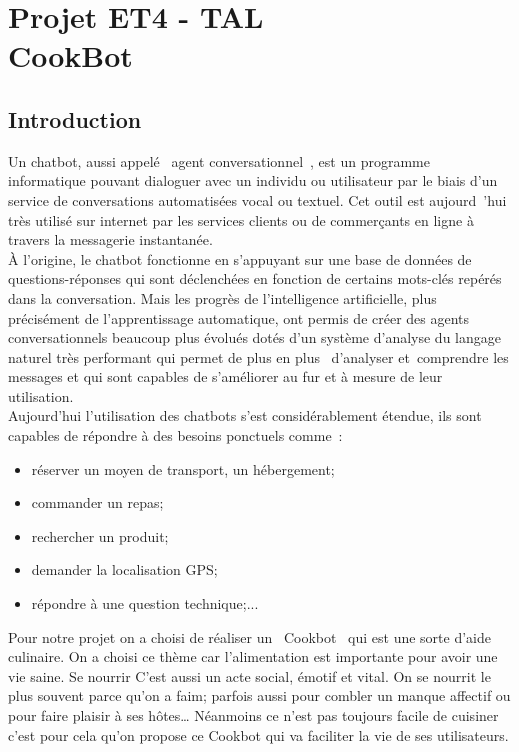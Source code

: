 \documentclass{report}
\title{}\let\mytitle\thetitle
\author{Karim \textsc{Balde}\\Yasmine \textsc{Kertous}\\Thibault \textsc{Lasou}}
\date\today
\begin{document}
\pagestyle{polytech}
\chapter*{Projet ET4 - TAL\\CookBot}
\section*{Introduction}

Un chatbot, aussi appelé \og agent conversationnel \fg{}, est un programme informatique pouvant dialoguer avec un individu ou utilisateur par le biais d'un service de conversations automatisées vocal ou textuel. Cet outil est aujourd 'hui très utilisé sur internet par les services clients ou de commerçants en ligne à travers la messagerie instantanée.\\

À l'origine, le chatbot fonctionne en s'appuyant sur une base de données de questions-réponses qui sont déclenchées en fonction de certains mots-clés repérés dans la conversation. Mais les progrès de l'intelligence artificielle, plus précisément de l'apprentissage automatique, ont permis de créer des agents conversationnels beaucoup plus évolués dotés d'un système d'analyse du langage naturel très performant qui  permet de plus en plus  d'analyser et comprendre les messages et qui sont capables de s'améliorer au fur et à mesure de leur utilisation.\\


Aujourd'hui l'utilisation des chatbots s'est considérablement étendue, ils sont capables de répondre à des besoins ponctuels comme :
\begin{itemize}
\item réserver un moyen de transport, un hébergement;
\item commander un repas;
\item rechercher un produit;
\item demander la localisation GPS;
\item répondre à une question technique;...
\end{itemize}
Pour notre projet on a choisi de réaliser un \og Cookbot \fg{} qui est une sorte d'aide culinaire. On a choisi ce thème car l’alimentation est importante pour avoir une vie saine. Se nourrir C'est aussi un acte social, émotif et vital. On se nourrit le plus souvent parce qu'on a faim; parfois aussi pour combler un manque affectif ou pour faire plaisir à ses hôtes… Néanmoins ce n'est pas toujours facile de cuisiner c'est pour cela qu'on propose ce Cookbot qui va faciliter la vie de ses utilisateurs.\\
\end{document}
